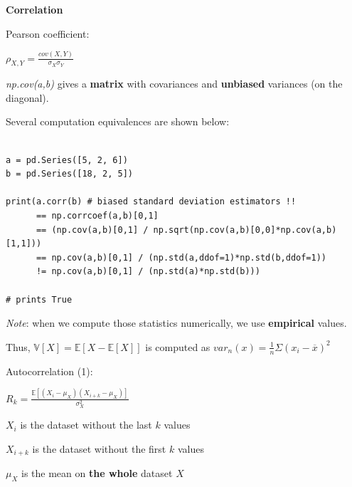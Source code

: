 {\fontsize{12pt}{22pt} \textbf{Correlation}\par}

\vspace{5mm}

Pearson coefficient:

\begin{center}
$\rho_{X,Y} = \frac{cov(X,Y)}{\sigma_X \sigma_Y}$
\end{center}

\textit{np.cov(a,b)} gives a \textbf{matrix} with covariances and \textbf{unbiased} variances (on the diagonal). 

Several computation equivalences are shown below:

\lstset{language=Python}
\lstset{frame=lines}
\lstset{basicstyle=\footnotesize}
\begin{lstlisting}

a = pd.Series([5, 2, 6])
b = pd.Series([18, 2, 5])

print(a.corr(b) # biased standard deviation estimators !!
      == np.corrcoef(a,b)[0,1] 
      == (np.cov(a,b)[0,1] / np.sqrt(np.cov(a,b)[0,0]*np.cov(a,b)[1,1]))
      == np.cov(a,b)[0,1] / (np.std(a,ddof=1)*np.std(b,ddof=1)) 
      != np.cov(a,b)[0,1] / (np.std(a)*np.std(b)))

# prints True

\end{lstlisting}

\vspace{5mm}

\textit{Note}: when we compute those statistics numerically, we use \textbf{empirical} values.

Thus, $\mathbb{V}[X] = \mathbb{E}[X-\mathbb{E}[X]]$ is computed as $var_n(x)=\frac{1}{n}\Sigma(x_i - \overline{x})^2$

\vspace{5mm}

Autocorrelation (1):

\begin{center}
$R_{k} = \frac{\mathbb{E}[(X_i-\mu_X)(X_{i+k}-\mu_X)]}{\sigma_X^2}$
\end{center}

$X_i$ is the dataset without the last $k$ values

$X_{i+k}$ is the dataset without the first $k$ values

$\mu_X$ is the mean on \textbf{the whole} dataset $X$

